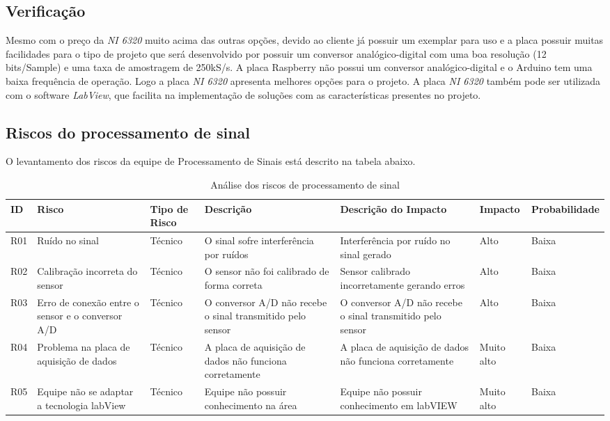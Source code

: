 \subsection{Verificação}

Mesmo com o preço da \textit{NI 6320} muito acima das outras opções, devido ao cliente já possuir um exemplar para uso e a placa possuir muitas facilidades para o tipo de projeto que será desenvolvido por possuir um conversor analógico-digital com uma boa resolução (12 bits/Sample) e uma taxa de amostragem de 250kS/s. A placa Raspberry não possui um conversor analógico-digital e o Arduino tem uma baixa frequência de operação. Logo a placa \textit{NI 6320} apresenta melhores opções para o projeto.
A placa \textit{NI 6320} também pode ser utilizada com o software \textit{LabView}, que facilita na implementação de soluções com as características presentes no projeto.

\subsection{Riscos do processamento de sinal}
O levantamento dos riscos da equipe de Processamento de Sinais está descrito na tabela abaixo.

\begin{table}
    \centering
    \begin{tabular}{|p{1cm}|p{2cm}|p{2cm}|p{3cm}|p{2cm}|p{1.7cm}|p{2.9cm}|}
    \hline
    \textbf{ID}  & \textbf{Risco} & \textbf{Tipo de Risco} & \textbf{Descrição} & \textbf{Descrição do Impacto} & \textbf{Impacto} & \textbf{Probabilidade} \\ \hline
    R01 & Ruído no sinal & Técnico & O sinal sofre interferência por ruídos & Interferência por ruído no sinal gerado & Alto & Baixa \\ \hline
    R02 & Calibração incorreta do sensor & Técnico & O sensor não foi calibrado de forma correta & Sensor calibrado incorretamente gerando erros & Alto & Baixa \\ \hline 
    R03 &Erro de conexão entre o sensor e o conversor A/D &Técnico &O conversor A/D não recebe o sinal  transmitido pelo sensor &O conversor A/D não recebe o sinal  transmitido pelo sensor &Alto &Baixa \\ \hline
    R04 &Problema na placa de aquisição de dados &Técnico &A placa de aquisição de dados não funciona corretamente &A placa de aquisição de dados não funciona corretamente &Muito alto &Baixa \\ \hline
    R05 &Equipe não se adaptar a tecnologia labView &Técnico &Equipe não possuir conhecimento na área &Equipe não possuir conhecimento em labVIEW &Muito alto &Baixa \\ \hline
\end{tabular}
    \caption{Análise dos riscos de processamento de sinal}
    \end{table}

